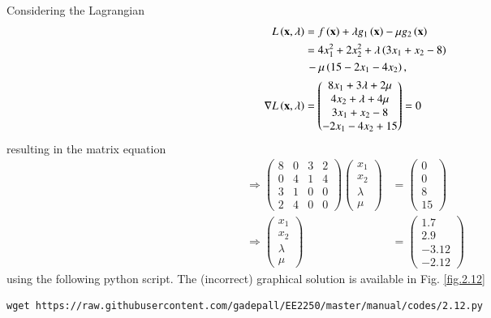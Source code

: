 \documentclass[journal,12pt,twocolumn]{IEEEtran}
\renewcommand\thesection{\arabic{section}}
\begin{document}
\begin{enumerate}[label=\thesection.\arabic*,ref=\thesection.\theenumi]
%
\solution Considering the Lagrangian
%
\begin{align}
L\left(\mathbf{x},\lambda\right) &= f\left(\mathbf{x}\right) + \lambda g_1\left(\mathbf{x}\right) - \mu g_2\left(\mathbf{x}\right) \\
 &= 4x_1^2 + 2x_2^2 + \lambda \left(3x_1 + x_2-8\right) 
 \nonumber \\
 &\,-\mu\left(15 - 2x_1 - 4x_2\right),\\
 \nabla L\left(\mathbf{x},\lambda\right)  & = 
\begin{pmatrix}
8x_1 + 3 \lambda  +2 \mu  \\
4x_2 + \lambda + 4 \mu \\
3x_1 + x_2 -8 \\
 - 2x_1 - 4x_2 + 15
\end{pmatrix}
= 0
\end{align}
%
resulting in the matrix equation
%
\begin{align}
\Rightarrow 
\begin{pmatrix}
8 &0 & 3 & 2\\
0 &4 & 1 & 4 \\
3 & 1 & 0 &0  \\
2 & 4 & 0 & 0
\end{pmatrix}
\begin{pmatrix}
x_1 \\
x_2 \\
\lambda
\\
\mu
\end{pmatrix}
&=
\begin{pmatrix}
0 \\
0 \\
8 \\
15
\end{pmatrix}
\\
\Rightarrow 
\begin{pmatrix}
x_1 \\
x_2 \\
\lambda
\\
\mu
\end{pmatrix}
&= 
\begin{pmatrix}
1.7 \\
 2.9 \\
-3.12 \\
-2.12
\end{pmatrix}
\end{align}
%
using the following python script.  The (incorrect) graphical solution is available in Fig. \ref{fig.2.12}
%	
\begin{lstlisting}
wget https://raw.githubusercontent.com/gadepall/EE2250/master/manual/codes/2.12.py
\end{lstlisting}


\end{enumerate}
\end{document}
